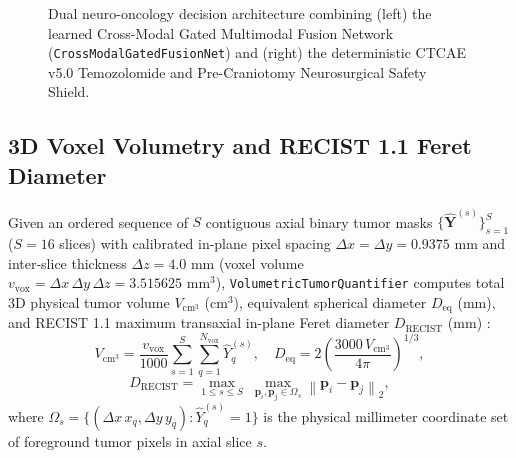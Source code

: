 \documentclass[journal,onecolumn,10pt]{IEEEtran}
\begin{document}
\begin{figure}[t]
\caption{Dual neuro-oncology decision architecture combining (left) the learned Cross-Modal Gated Multimodal Fusion Network (\texttt{CrossModalGatedFusionNet}) and (right) the deterministic CTCAE v5.0 Temozolomide and Pre-Craniotomy Neurosurgical Safety Shield.}
\label{fig:fusion}
\end{figure}

\subsection{3D Voxel Volumetry and RECIST 1.1 Feret Diameter}
Given an ordered sequence of $S$ contiguous axial binary tumor masks $\{\hat{\mathbf{Y}}^{(s)}\}_{s=1}^S$ ($S = 16$ slices) with calibrated in-plane pixel spacing $\Delta x = \Delta y = 0.9375\text{ mm}$ and inter-slice thickness $\Delta z = 4.0\text{ mm}$ (voxel volume $v_{\text{vox}} = \Delta x\,\Delta y\,\Delta z = 3.515625\text{ mm}^3$), \texttt{VolumetricTumorQuantifier} computes total 3D physical tumor volume $V_{\text{cm}^3}$ ($\text{cm}^3$), equivalent spherical diameter $D_{\text{eq}}$ ($\text{mm}$), and RECIST 1.1 maximum transaxial in-plane Feret diameter $D_{\text{RECIST}}$ ($\text{mm}$) \cite{eisenhauer2009recist}:
\begin{equation}
    V_{\text{cm}^3} = \frac{v_{\text{vox}}}{1000}\sum_{s=1}^{S}\sum_{q=1}^{N_{\text{vox}}} \hat{Y}^{(s)}_q, \quad D_{\text{eq}} = 2\!\left(\frac{3000\,V_{\text{cm}^3}}{4\pi}\right)^{1/3},
    \label{eq:volumetry}
\end{equation}
\begin{equation}
    D_{\text{RECIST}} = \max_{1 \le s \le S}\; \max_{\mathbf{p}_i, \mathbf{p}_j \in \Omega_s} \left\|\mathbf{p}_i - \mathbf{p}_j\right\|_2,
    \label{eq:recist}
\end{equation}
where $\Omega_s = \{(\Delta x\,x_q, \Delta y\,y_q) : \hat{Y}^{(s)}_q = 1\}$ is the physical millimeter coordinate set of foreground tumor pixels in axial slice $s$.
\end{document}
